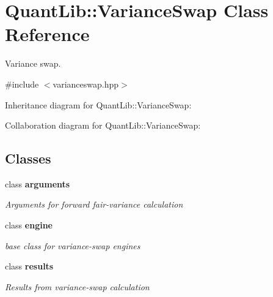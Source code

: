 \section{Quant\+Lib\+:\+:Variance\+Swap Class Reference}
\label{class_quant_lib_1_1_variance_swap}


Variance swap.  




{\ttfamily \#include $<$varianceswap.\+hpp$>$}



Inheritance diagram for Quant\+Lib\+:\+:Variance\+Swap\+:


Collaboration diagram for Quant\+Lib\+:\+:Variance\+Swap\+:
\subsection*{Classes}
\begin{DoxyCompactItemize}
\item 
class {\bf arguments}
\begin{DoxyCompactList}\small\item\em Arguments for forward fair-\/variance calculation \end{DoxyCompactList}\item 
class {\bf engine}
\begin{DoxyCompactList}\small\item\em base class for variance-\/swap engines \end{DoxyCompactList}\item 
class {\bf results}
\begin{DoxyCompactList}\small\item\em Results from variance-\/swap calculation \end{DoxyCompactList}\end{DoxyCompactItemize}
